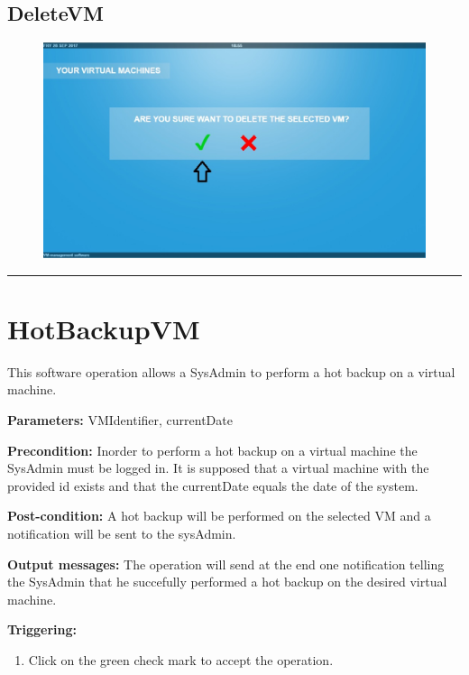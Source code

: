  
\subsection{DeleteVM}

\begin{figure}[H]
\centering
\includegraphics[width=170mm]{images/deleteVM5.eps}
\caption{\label{overflow}}
\end{figure}


\hrule
\vspace{0.5cm}









\section{HotBackupVM}
\label{operation:HotBackupVM}
This software operation allows a SysAdmin to perform a hot backup on a virtual
machine.
\begin{description}

\item \textbf{Parameters:} VMIdentifier, currentDate
\item \textbf{Precondition:} Inorder to perform a hot backup on a virtual
machine the SysAdmin must be logged in. It is supposed that a virtual machine
with the provided id exists and that the currentDate equals the date of the
system.
\item \textbf{Post-condition:} A hot backup will be performed on the selected
VM and a notification will be sent to the sysAdmin.
\item \textbf{Output messages:} The operation will send at the end one
notification telling the SysAdmin that he succefully performed a hot backup on
the desired virtual machine.

\item \textbf{Triggering:}
\begin{enumerate}
\item Click on the green check mark to accept the operation.
\end{enumerate}

 
\end{description}

